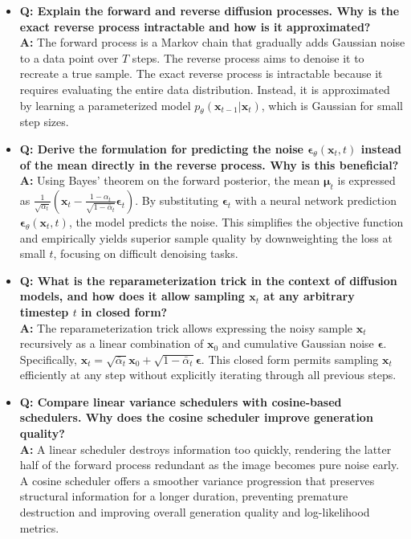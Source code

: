 \begin{itemize}
    \item \textbf{Q: Explain the forward and reverse diffusion processes. Why is the exact reverse process intractable and how is it approximated?} \\
    \textbf{A:} The forward process is a Markov chain that gradually adds Gaussian noise to a data point over $T$ steps. The reverse process aims to denoise it to recreate a true sample. The exact reverse process is intractable because it requires evaluating the entire data distribution. Instead, it is approximated by learning a parameterized model $p_\theta(\mathbf{x}_{t-1} | \mathbf{x}_t)$, which is Gaussian for small step sizes.
    \item \textbf{Q: Derive the formulation for predicting the noise $\boldsymbol{\epsilon}_\theta(\mathbf{x}_t, t)$ instead of the mean directly in the reverse process. Why is this beneficial?} \\
    \textbf{A:} Using Bayes' theorem on the forward posterior, the mean $\boldsymbol{\mu}_t$ is expressed as $\frac{1}{\sqrt{\alpha_t}} \left( \mathbf{x}_t - \frac{1 - \alpha_t}{\sqrt{1 - \bar{\alpha}_t}} \boldsymbol{\epsilon}_t \right)$. By substituting $\boldsymbol{\epsilon}_t$ with a neural network prediction $\boldsymbol{\epsilon}_\theta(\mathbf{x}_t, t)$, the model predicts the noise. This simplifies the objective function and empirically yields superior sample quality by downweighting the loss at small $t$, focusing on difficult denoising tasks.
    \item \textbf{Q: What is the reparameterization trick in the context of diffusion models, and how does it allow sampling $\mathbf{x}_t$ at any arbitrary timestep $t$ in closed form?} \\
    \textbf{A:} The reparameterization trick allows expressing the noisy sample $\mathbf{x}_t$ recursively as a linear combination of $\mathbf{x}_0$ and cumulative Gaussian noise $\boldsymbol{\epsilon}$. Specifically, $\mathbf{x}_t = \sqrt{\bar{\alpha}_t} \mathbf{x}_0 + \sqrt{1 - \bar{\alpha}_t} \boldsymbol{\epsilon}$. This closed form permits sampling $\mathbf{x}_t$ efficiently at any step without explicitly iterating through all previous steps.
    \item \textbf{Q: Compare linear variance schedulers with cosine-based schedulers. Why does the cosine scheduler improve generation quality?} \\
    \textbf{A:} A linear scheduler destroys information too quickly, rendering the latter half of the forward process redundant as the image becomes pure noise early. A cosine scheduler offers a smoother variance progression that preserves structural information for a longer duration, preventing premature destruction and improving overall generation quality and log-likelihood metrics.

\end{itemize}
